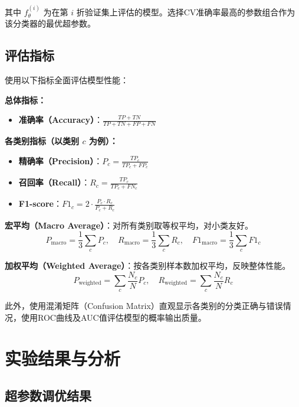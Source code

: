 \documentclass[12pt,a4paper]{ctexart}
\begin{document}
其中 $f_{\theta}^{(i)}$ 为在第 $i$ 折验证集上评估的模型。选择CV准确率最高的参数组合作为该分类器的最优超参数。

\subsection{评估指标}

使用以下指标全面评估模型性能：

\textbf{总体指标：}
\begin{itemize}
    \item \textbf{准确率（Accuracy）}：$\frac{TP+TN}{TP+TN+FP+FN}$
\end{itemize}

\textbf{各类别指标（以类别 $c$ 为例）：}
\begin{itemize}
    \item \textbf{精确率（Precision）}：$P_c = \frac{TP_c}{TP_c + FP_c}$
    \item \textbf{召回率（Recall）}：$R_c = \frac{TP_c}{TP_c + FN_c}$
    \item \textbf{F1-score}：$F1_c = 2 \cdot \frac{P_c \cdot R_c}{P_c + R_c}$
\end{itemize}

\textbf{宏平均（Macro Average）}：对所有类别取等权平均，对小类友好。
\begin{equation}
    P_{\text{macro}} = \frac{1}{3}\sum_{c} P_c, \quad R_{\text{macro}} = \frac{1}{3}\sum_{c} R_c, \quad F1_{\text{macro}} = \frac{1}{3}\sum_{c} F1_c
\end{equation}

\textbf{加权平均（Weighted Average）}：按各类别样本数加权平均，反映整体性能。
\begin{equation}
    P_{\text{weighted}} = \sum_{c} \frac{N_c}{N} P_c, \quad R_{\text{weighted}} = \sum_{c} \frac{N_c}{N} R_c
\end{equation}

此外，使用混淆矩阵（Confusion Matrix）直观显示各类别的分类正确与错误情况，使用ROC曲线及AUC值评估模型的概率输出质量。

\section{实验结果与分析}

\subsection{超参数调优结果}
\end{document}

